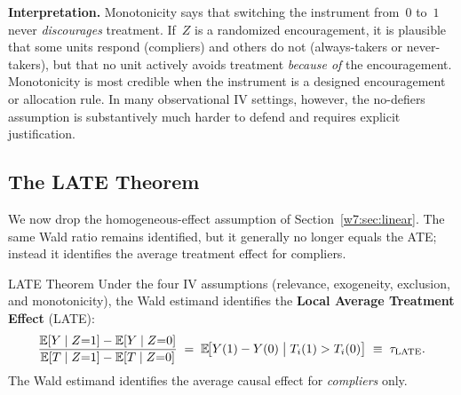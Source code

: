 \documentclass[master.tex]{subfiles}
\begin{document}
\noindent\textbf{Interpretation.}  Monotonicity says that switching
the instrument from~$0$ to~$1$ never \emph{discourages} treatment.
If~$Z$ is a randomized encouragement, it is plausible that some
units respond (compliers) and others do not (always-takers or
never-takers), but that no unit actively avoids treatment
\emph{because of} the encouragement.  Monotonicity is most
credible when the instrument is a designed encouragement or
allocation rule.  In many observational IV settings, however, the
no-defiers assumption is substantively much harder to defend and
requires explicit justification.

\subsection{The LATE Theorem}

We now drop the homogeneous-effect assumption of
Section~\ref{w7:sec:linear}.  The same Wald ratio remains
identified, but it generally no longer equals the ATE; instead it
identifies the average treatment effect for compliers.

\begin{thm}{LATE Theorem \citep{imbens1994identification}}
\label{w7:thm:late}
Under the four IV assumptions (relevance, exogeneity, exclusion, and
monotonicity), the Wald estimand identifies the \textbf{Local
Average Treatment Effect} (LATE):
\[
  \frac{\mathbb{E}[Y \mid Z{=}1] - \mathbb{E}[Y \mid Z{=}0]}
       {\mathbb{E}[T \mid Z{=}1] - \mathbb{E}[T \mid Z{=}0]}
  \;=\;
  \mathbb{E}\!\bigl[Y(1) - Y(0) \;\big|\; T_i(1) > T_i(0)\bigr]
  \;\equiv\; \tau_{\mathrm{LATE}}.
\]
The Wald estimand identifies the average causal effect for
\emph{compliers} only.
\end{thm}
\end{document}
